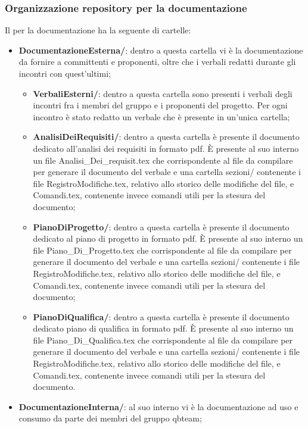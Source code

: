 \subsubsection{Organizzazione repository per la documentazione}
Il  per la documentazione ha la seguente  di cartelle:
\begin{itemize}
	\item \textbf{DocumentazioneEsterna/}: dentro a questa cartella vi è la documentazione da fornire a committenti e proponenti, oltre che i verbali redatti durante gli incontri con quest'ultimi;
	\begin{itemize}
		\item \textbf{VerbaliEsterni/}: dentro a questa cartella sono presenti i verbali degli incontri fra i membri del gruppo e i proponenti del progetto. Per ogni incontro è stato redatto un verbale che è presente in un'unica cartella;
		\item \textbf{AnalisiDeiRequisiti/}: dentro a questa cartella è presente il documento dedicato all’analisi dei requisiti in formato pdf. È presente al suo interno un file Analisi\_Dei\_requisit.tex che corrispondente al file da compilare per generare il documento del verbale e una cartella sezioni/ contenente i file RegistroModifiche.tex, relativo allo storico delle modifiche del file, e Comandi.tex, contenente invece comandi utili per la stesura del documento;
		\item \textbf{PianoDiProgetto/}: dentro a questa cartella è presente il documento dedicato al piano di progetto in formato pdf. È presente al suo interno un file Piano\_Di\_Progetto.tex che corrispondente al file da compilare per generare il documento del verbale e una cartella sezioni/ contenente i file RegistroModifiche.tex, relativo allo storico delle modifiche del file, e Comandi.tex, contenente invece comandi utili per la stesura del documento;
		\item \textbf{PianoDiQualifica/}: dentro a questa cartella è presente il documento dedicato piano di qualifica in formato pdf. È presente al suo interno un file Piano\_Di\_Qualifica.tex che corrispondente al file da compilare per generare il documento del verbale e una cartella sezioni/ contenente i file RegistroModifiche.tex, relativo allo storico delle modifiche del file, e Comandi.tex, contenente invece comandi utili per la stesura del documento.
	\end{itemize}
	\item \textbf{DocumentazioneInterna/}: al suo interno vi è la documentazione ad uso e consumo da parte dei membri del gruppo qbteam;

\end{itemize}
